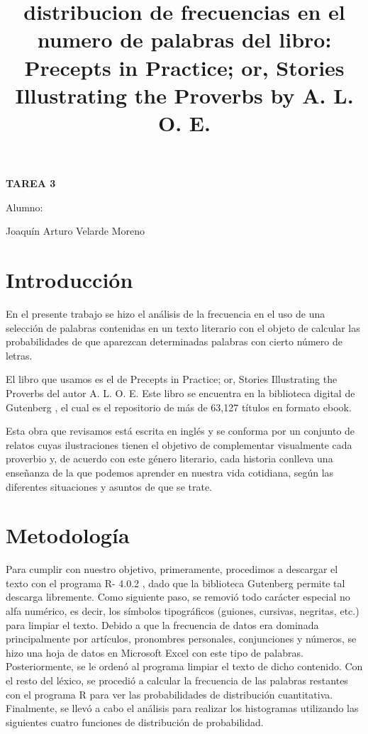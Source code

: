 \documentclass[]{article}
\title{distribucion de frecuencias en el numero de palabras del libro:
 Precepts in Practice; or, Stories Illustrating the Proverbs by A. L. O. E. }
\date{}
\begin{document}
	\maketitle
	\begin{center}


\centerline{\textbf{TAREA 3} } 
\textbf{ }

\centerline{Alumno: } 
\centerline{Joaquín Arturo Velarde Moreno}


	\end{center}
	

\section{Introducción}
En el presente trabajo se hizo el análisis de la frecuencia en el uso de una selección de palabras contenidas en un texto literario con el objeto de calcular las probabilidades de que aparezcan determinadas palabras con cierto número de letras.

El libro que usamos es el de Precepts in Practice; or, Stories Illustrating the Proverbs del autor A. L. O. E.  \cite{proverbs} 
Este libro se encuentra en la biblioteca digital de Gutenberg  \cite{guten},  el cual es el repositorio de más de 63,127 títulos en formato ebook.

Esta obra que revisamos está escrita en inglés y se conforma por un conjunto de relatos cuyas ilustraciones tienen el objetivo de complementar visualmente cada proverbio y, de acuerdo con este género literario, cada historia conlleva una enseñanza de la que podemos aprender en nuestra vida cotidiana, según las diferentes situaciones y asuntos de que se trate.



\section{Metodología}
Para cumplir con nuestro objetivo, primeramente, procedimos a descargar el texto con el programa R- 4.0.2 \cite{rproject} , dado que la biblioteca Gutenberg \cite{guten} permite tal descarga libremente.
Como siguiente paso, se removió todo carácter especial no alfa numérico, es decir, los símbolos tipográficos (guiones, cursivas, negritas, etc.) para limpiar el texto.
Debido a que la frecuencia de datos era dominada principalmente por artículos, pronombres personales, conjunciones y números, se hizo una hoja de datos en Microsoft Excel \cite{excel} con este tipo de palabras. Posteriormente, se le ordenó al programa limpiar el texto de dicho contenido.
Con el resto del léxico, se procedió a calcular la frecuencia de las palabras restantes con el programa R para ver las probabilidades de distribución cuantitativa.
Finalmente, se llevó a cabo el análisis para realizar los histogramas utilizando las siguientes cuatro funciones de distribución de probabilidad.
\end{document}
